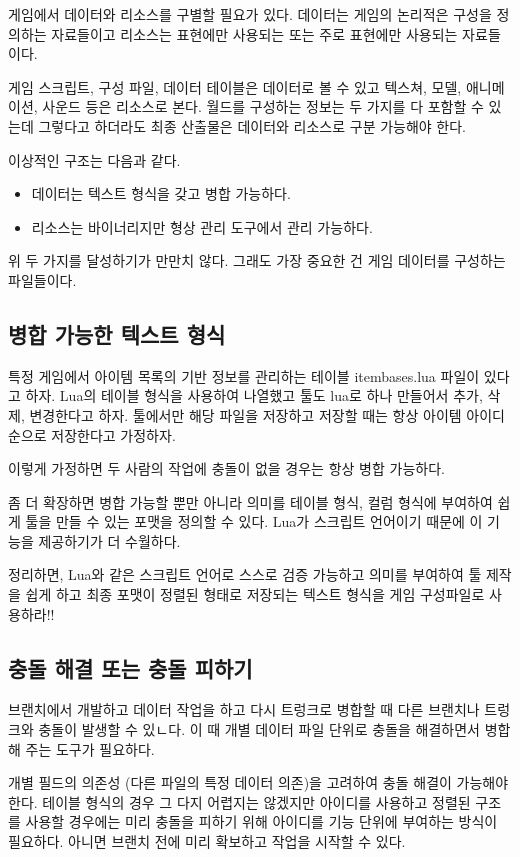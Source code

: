 \documentclass[chapter,kosection, 10.5pt, romanfixed, a4paper]{oblivoir}
\begin{document}
게임에서 데이터와 리소스를 구별할 필요가 있다. 데이터는 게임의 논리적은 구성을 정의하는 자료들이고 
리소스는 표현에만 사용되는 또는 주로 표현에만 사용되는 자료들이다. 

게임 스크립트, 구성 파일, 데이터 테이블은 데이터로 볼 수 있고 텍스쳐, 모델, 애니메이션, 사운드 등은
리소스로 본다. 월드를 구성하는 정보는 두 가지를 다 포함할 수 있는데 그렇다고 하더라도 최종 산출물은
데이터와 리소스로 구분 가능해야 한다. 

이상적인 구조는 다음과 같다. 
\begin{itemize}
\item 데이터는 텍스트 형식을 갖고 병합 가능하다. 
\item 리소스는 바이너리지만 형상 관리 도구에서 관리 가능하다. 
\end{itemize}

위 두 가지를 달성하기가 만만치 않다. 그래도 가장 중요한 건 게임 데이터를 구성하는 파일들이다. 

\subsection{병합 가능한 텍스트 형식}

특정 게임에서 아이템 목록의 기반 정보를 관리하는 테이블 itembases.lua 파일이 있다고 하자. 
Lua의 테이블 형식을 사용하여 나열했고 툴도 lua로 하나 만들어서 추가, 삭제, 변경한다고 하자. 
툴에서만 해당 파일을 저장하고 저장할 때는 항상 아이템 아이디 순으로 저장한다고 가정하자. 

이렇게 가정하면 두 사람의 작업에 충돌이 없을 경우는 항상 병합 가능하다. 

좀 더 확장하면 병합 가능할 뿐만 아니라 의미를 테이블 형식, 컬럼 형식에 부여하여 쉽게 
툴을 만들 수 있는 포맷을 정의할 수 있다. Lua가 스크립트 언어이기 때문에 이 기능을 제공하기가 
더 수월하다. 

정리하면, Lua와 같은 스크립트 언어로 스스로 검증 가능하고 의미를 부여하여 툴 제작을 쉽게 하고 
최종 포맷이 정렬된 형태로 저장되는 텍스트 형식을 게임 구성파일로 사용하라!!

\subsection{충돌 해결 또는 충돌 피하기}

브랜치에서 개발하고 데이터 작업을 하고 다시 트렁크로 병합할 때 다른 브랜치나 트렁크와 
충돌이 발생할 수 있ㄴ다. 이 때 개별 데이터 파일 단위로 충돌을 해결하면서 병합해 주는 도구가 필요하다. 

개별 필드의 의존성 (다른 파일의 특정 데이터 의존)을 고려하여 충돌 해결이 가능해야 한다. 
테이블 형식의 경우 그 다지 어렵지는 않겠지만 아이디를 사용하고 정렬된 구조를 사용할 경우에는
미리 충돌을 피하기 위해 아이디를 기능 단위에 부여하는 방식이 필요하다. 아니면 브랜치 전에 
미리 확보하고 작업을 시작할 수 있다. 
\end{document}

